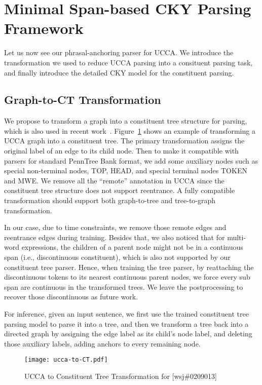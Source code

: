 \section{Minimal Span-based CKY Parsing Framework}
\label{sec:phr:cky-based}

Let us now see our phrasal-anchoring parser for UCCA. We introduce
the transformation we used to reduce UCCA parsing into a consituent
parsing task, and finally introduce the detailed CKY model for the
constituent parsing.


\subsection{Graph-to-CT Transformation}
\label{ssec:phr:graph-ct}

We propose to transform a graph into a constituent tree structure for
parsing, which is also used in recent work~\cite{jiang2019hlt}.
Figure~\ref{fig:ucca-to-CT} shows an example of transforming a UCCA
graph into a constituent tree. The primary transformation assigns the
original label of an edge to its child node. Then to make it
compatible with parsers for standard PennTree Bank format, we add some
auxiliary nodes such as special non-terminal nodes, TOP, HEAD, and
special terminal nodes TOKEN and MWE. We remove all the ``remote''
annotation in UCCA since the constituent tree structure does not
support reentrance.  A fully compatible transformation should support
both graph-to-tree and tree-to-graph transformation.

In our case, due to time constraints, we remove those remote edges and
reentrance edges during training. Besides that, we also noticed that
for multi-word expressions, the children of a parent node might not be
in a continuous span (i.e., discontinuous constituent), which is also
not supported by our constituent tree parser. Hence, when training the
tree parser, by reattaching the discontinuous tokens to its nearest
continuous parent nodes, we force every sub span are continuous in the
transformed trees. We leave the postprocessing to recover those
discontinuous as future work.

For inference, given an input sentence, we first use the trained
constituent tree parsing model to parse it into a tree, and then we
transform a tree back into a directed graph by assigning the edge
label as its child's node label, and deleting those auxiliary labels,
adding anchors to every remaining node.

\begin{figure}[!h]
\centering
\texttt{[image: ucca-to-CT.pdf]}
\caption{\label{fig:ucca-to-CT} UCCA to Constituent Tree Transformation for [wsj\#0209013]}
\end{figure}


